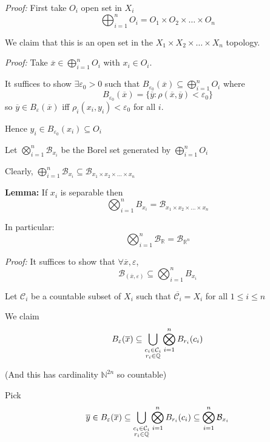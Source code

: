 \documentclass[12pt]{article}
\newcommand{\R}{\mathbb{R}}
\newcommand{\N}{\mathbb{N}}
\newcommand{\Q}{\mathbb{Q}}
\newcommand{\ep}{\varepsilon}
\newcommand{\B}{\mathcal{B}}
\newcommand{\sub}{\subseteq}
\renewcommand{\bar}[1]{\overline{#1}}
\newenvironment*{tbox}[2][gray]{
    \begin{tcolorbox}[
        parbox=false,
        colback=#1!5!white,
        colframe=#1!75!black,
        breakable,
        title={#2}
    ]}
    {\end{tcolorbox}}
\newenvironment*{proof}[1][blue]{
\begin{tcolorbox}[
    parbox=false,
    colback=#1!5!white,
    colframe=#1!75!black,
    breakable
]}
{\end{tcolorbox}}
\begin{document}
    \begin{tbox}{\textbf{Proposition:} $B_{\R^n}$ is  }
        \emph{Proof:} First take $O_i$ open set in $X_i$ 
        \[\bigoplus_{i=1}^n O_i = O_1 \times O_2 \times \dots \times O_n \]

        We claim that this is an open set in the $X_1 \times X_2 \times \dots \times X_n$ topology.

        \begin{proof}
            \emph{Proof:} Take $\bar x \in \bigoplus_{i=1}^n O_i$ with $x_i \in O_i$. 

            It suffices to show $\exists \ep_0 > 0$ such that $B_{\ep_0}(\bar x) \sub \bigoplus_{i=1}^n O_i$ where 
            \[B_{\ep_0}(\bar x) = \{\bar y: \rho(\bar x, \bar y) < \ep_0\}\]
            so $\bar y \in B_{\ep}(\bar x)$ iff $\rho_i(x_i, y_i) < \ep_0$ for all $i$.

            Hence $y_i \in B_{\ep_0}(x_i) \sub O_i$
        \end{proof}

        Let $\bigotimes_{i=1}^n \B_{x_i}$ be the Borel set generated by $\bigoplus_{i=1}^n O_i$

        Clearly, $\bigoplus_{i=1}^n \B_{x_i} \sub \B_{x_1 \times x_2 \times \dots \times x_n}$
        
        \textbf{Lemma:} If $x_i$ is separable then 
        \[\bigotimes_{i=1}^n B_{x_i} = \B_{x_1 \times x_2 \times \dots\times x_n}\]

        In particular: 
        \[\bigotimes_{i=1}^n \B_{\R} = \B_{\R^n}\]

        \begin{proof}
            \emph{Proof:} It suffices to show that $\forall \bar x, \ep$, 
            \[\B_{(\bar x, \ep)} \sub \bigotimes_{i=1}^n B_{x_i}\]

            Let $\mathcal{C}_i$ be a countable subset of $X_i$ such that $\bar{\mathcal{C}_i} = X_i$ for all $1 \leq i \leq n$

            We claim 
            \[B_{\ep}(\bar x) \sub \bigcup_{\begin{subarray}{c} c_i \in \mathcal{C}_i \\ r_i \in \Q \end{subarray}} \bigotimes_{i=1}^n B_{r_i}(c_i)\]

            (And this has cardinality $\N^{2n}$ so countable)

            Pick 
            \[\bar y \in B_{\ep}(\bar x) \sub \bigcup_{\begin{subarray}{c} c_i \in \mathcal{C}_i \\ r_i \in \Q \end{subarray}} \bigotimes_{i=1}^n B_{r_i}(c_i) \sub \bigotimes_{i=1}^n \B_{x_i}\] 


\end{proof}
\end{tbox}
\end{document}
